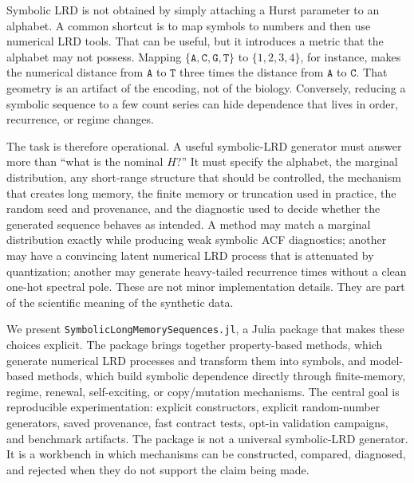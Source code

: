 \documentclass[journal]{IEEEtran}
\newcommand{\pkg}[1]{\texttt{#1}}
\newcommand{\sfive}{\pkg{SymbolicLongMemorySequences.jl}}
\begin{document}
Symbolic LRD is not obtained by simply attaching a Hurst parameter to an
alphabet.  A common shortcut is to map symbols to numbers and then use numerical
LRD tools.  That can be useful, but it introduces a metric that the alphabet may
not possess.  Mapping \(\{\mathtt{A},\mathtt{C},\mathtt{G},\mathtt{T}\}\) to
\(\{1,2,3,4\}\), for instance, makes the numerical distance from
\(\mathtt{A}\) to \(\mathtt{T}\) three times the distance from \(\mathtt{A}\) to
\(\mathtt{C}\).  That geometry is an artifact of the encoding, not of the
biology.  Conversely, reducing a symbolic sequence to a few count series can
hide dependence that lives in order, recurrence, or regime changes.

The task is therefore operational.  A useful symbolic-LRD generator must answer
more than ``what is the nominal \(H\)?''  It must specify the alphabet, the
marginal distribution, any short-range structure that should be controlled, the
mechanism that creates long memory, the finite memory or truncation used in
practice, the random seed and provenance, and the diagnostic used to decide
whether the generated sequence behaves as intended.  A method may match a
marginal distribution exactly while producing weak symbolic ACF diagnostics;
another may have a convincing latent numerical LRD process that is attenuated by
quantization; another may generate heavy-tailed recurrence times without a clean
one-hot spectral pole.  These are not minor implementation details.  They are
part of the scientific meaning of the synthetic data.

We present \sfive{}, a Julia package that makes these choices explicit.  The
package brings together property-based methods, which generate numerical LRD
processes and transform them into symbols, and model-based methods, which build
symbolic dependence directly through finite-memory, regime, renewal,
self-exciting, or copy/mutation mechanisms.  The central goal is reproducible
experimentation: explicit constructors, explicit random-number generators, saved
provenance, fast contract tests, opt-in validation campaigns, and benchmark
artifacts.  The package is not a universal symbolic-LRD generator.  It is a
workbench in which mechanisms can be constructed, compared, diagnosed, and
rejected when they do not support the claim being made.
\end{document}
